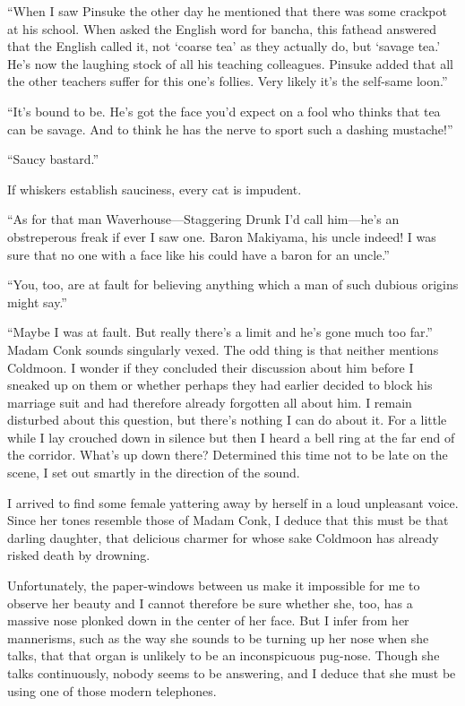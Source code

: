\documentclass[12pt, openright]{book}
\begin{document}
``When I saw Pinsuke the other day he mentioned that there was some
crackpot at his school. When asked the English word for bancha, this
fathead answered that the English called it, not `coarse tea' as they
actually do, but `savage tea.' He's now the laughing stock of all his
teaching colleagues. Pinsuke added that all the other teachers suffer
for this one's follies. Very likely it's the self-same loon.''

``It's bound to be. He's got the face you'd expect on a fool who thinks
that tea can be savage. And to think he has the nerve to sport such a
dashing mustache!''

``Saucy bastard.''

If whiskers establish sauciness, every cat is impudent.

``As for that man Waverhouse---Staggering Drunk I'd call him---he's an
obstreperous freak if ever I saw one. Baron Maki\-yama, his uncle indeed!
I was sure that no one with a face like his could have a baron for an
uncle.''

``You, too, are at fault for believing anything which a man of such
dubious origins might say.''

``Maybe I was at fault. But really there's a limit and he's gone much
too far.'' Madam Conk sounds singularly vexed. The odd thing is that
neither mentions Coldmoon. I wonder if they concluded their discussion
about him before I sneaked up on them or whether perhaps they had
earlier decided to block his marriage suit and had therefore already
forgotten all about him. I remain disturbed about this question, but
there's nothing I can do about it. For a little while I lay crouched
down in silence but then I heard a bell ring at the far end of the
corridor. What's up down there? Determined this time not to be late on
the scene, I set out smartly in the direction of the sound.

I arrived to find some female yattering away by herself in a loud
unpleasant voice. Since her tones resemble those of Madam Conk, I deduce
that this must be that darling daughter, that delicious charmer for
whose sake Coldmoon has already risked death by drowning.

Unfortunately, the paper-windows between us make it impossible for me to
observe her beauty and I cannot therefore be sure whether she, too, has
a massive nose plonked down in the center of her face. But I infer from
her mannerisms, such as the way she sounds to be turning up her nose
when she talks, that that organ is unlikely to be an inconspicuous
pug-nose. Though she talks continuously, nobody seems to be answering,
and I deduce that she must be using one of those modern telephones.
\end{document}
